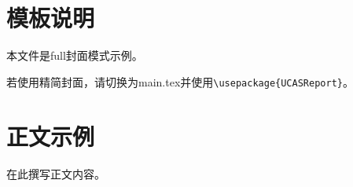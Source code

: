 \documentclass[12pt,hyperref,a4paper,UTF8]{ctexart}
\begin{document}
\cover

%
%

\thispagestyle{empty} %

\newpage
\tableofcontents

\newpage

\section{模板说明}
本文件是full封面模式示例。

若使用精简封面，请切换为main.tex并使用\verb|\usepackage{UCASReport}|。

\section{正文示例}
在此撰写正文内容。

\end{document}
